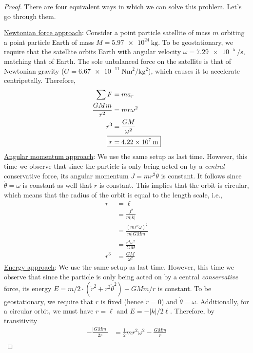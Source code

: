\documentclass[../psets.tex]{subfiles}
\begin{document}
\begin{enumerate}
    \begin{proof}
        There are four equivalent ways in which we can solve this problem. Let's go through them.\par\smallskip
        \underline{Newtonian force approach}: Consider a point particle satellite of mass $m$ orbiting a point particle Earth of mass $M=\SI{5.97e24}{\kilo\gram}$. To be geostationary, we require that the satellite orbits Earth with angular velocity $\omega=\SI{7.29e-5}{\per\second}$, matching that of Earth. The sole unbalanced force on the satellite is that of Newtonian gravity ($G=\SI{6.67e-11}{\newton\meter\squared\per\kilo\gram\squared}$), which causes it to accelerate centripetally. Therefore,
        \begin{align*}
            \sum F &= ma_r\\
            \frac{GMm}{r^2} &= mr\omega^2\\
            r^3 &= \frac{GM}{\omega^2}\\
            \Aboxed{r &= \SI{4.22e7}{\meter}}
        \end{align*}
        \underline{Angular momentum approach}: We use the same setup as last time. However, this time we observe that since the particle is only being acted on by a \emph{central} conservative force, its angular momentum $J=mr^2\dot{\theta}$ is constant. It follows since $\dot{\theta}=\omega$ is constant as well that $r$ is constant. This implies that the orbit is circular, which means that the radius of the orbit is equal to the length scale, i.e.,
        \begin{align*}
            r &= \ell\\
            &= \frac{J^2}{m|k|}\\
            &= \frac{(mr^2\omega)^2}{m|GMm|}\\
            &= \frac{r^4\omega^2}{GM}\\
            r^3 &= \frac{GM}{\omega^2}
        \end{align*}
        \underline{Energy approach}: We use the same setup as last time. However, this time we observe that since the particle is only being acted on by a central \emph{conservative} force, its energy $E=m/2\cdot(\dot{r}^2+r^2\dot{\theta}^2)-GMm/r$ is constant. To be geostationary, we require that $r$ is fixed (hence $\dot{r}=0$) and $\dot{\theta}=\omega$. Additionally, for a circular orbit, we must have $r=\ell$ and $E=-|k|/2\ell$. Therefore, by transitivity
        \begin{align*}
            -\frac{|GMm|}{2r} &= \frac{1}{2}mr^2\omega^2-\frac{GMm}{r}\\

\end{align*}
\end{proof}
\end{enumerate}
\end{document}
